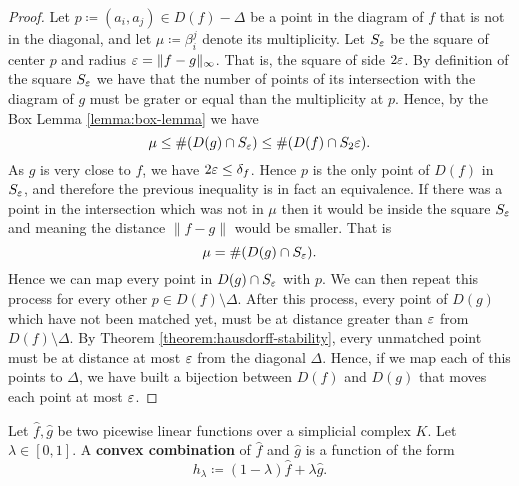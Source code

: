 \begin{proof}
    Let $ p \coloneq (a_i, a_j) \in D(f) - \Delta $ be a point in the diagram of $ f $ that is not in the diagonal, and let $ \mu \coloneq \beta_i^j $ denote its multiplicity. Let $S_\varepsilon$ be the square of center $ p $ and radius $\varepsilon = \| f- g \|_\infty $. That is, the square of side $ 2 \varepsilon $. By definition of the square $ S_\varepsilon $ we have that the number of points of its intersection with the diagram of $ g $ must be grater or equal than the multiplicity at $ p $. Hence, by the Box Lemma \ref{lemma:box-lemma} we have
    \begin{equation}
        \mu \leq \# (D(g) \cap S_\varepsilon) \leq \#(D(f) \cap S_2\varepsilon).
    \end{equation}
    As $ g $ is very close to $ f $, we have $ 2\varepsilon \leq \delta_f $. Hence $ p $ is the only point of $ D(f) $ in $ S_\varepsilon$, and therefore the previous inequality is in fact an equivalence. If there was a point in the intersection which was not in $\mu $ then it would be inside the square $ S_\varepsilon $ and meaning the distance $\| f - g \| $ would be smaller. That is
    \begin{equation}
        \mu = \# (D(g) \cap S_\varepsilon).
    \end{equation}
    Hence we can map every point in $ D(g) \cap S_\varepsilon $ with $ p $. We can then repeat this process for every other $ p \in D(f) \setminus \Delta $. After this process, every point of $ D(g) $ which have not been matched yet, must be at distance greater than $ \varepsilon $ from $ D(f) \setminus \Delta $. By Theorem \ref{theorem:hausdorff-stability}, every unmatched point must be at distance at most $ \varepsilon $ from the diagonal $ \Delta $. Hence, if we map each of this points to $ \Delta $, we have built a bijection between $ D(f) $ and $ D(g) $ that moves each point at most $ \varepsilon $.
\end{proof}

\begin{definition}
    Let $\hat f, \hat g $ be two picewise linear functions over a simplicial complex $ K $. Let $ \lambda \in [0, 1] $. A {\bf convex combination} of $ \hat f $ and $ \hat g $ is a function of the form
    $$
        h_\lambda \coloneq (1-\lambda) \hat f + \lambda \hat g.
    $$
\end{definition}

